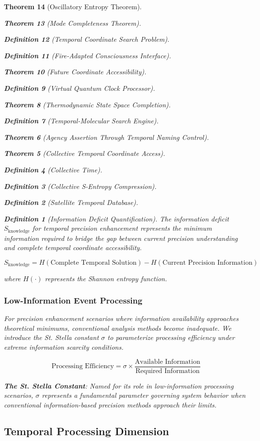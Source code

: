 \documentclass[12pt,a4paper]{article}
\newtheorem{theorem}{Theorem}[section]
\newtheorem{definition}[theorem]{Definition}
\begin{document}
\begin{theorem}[Oscillatory Entropy Theorem]
\begin{theorem}[Mode Completeness Theorem]
\begin{enumerate}
\begin{definition}[Temporal Coordinate Search Problem]
\begin{algorithm}
\begin{definition}[Fire-Adapted Consciousness Interface]
\begin{theorem}[Future Coordinate Accessibility]
\begin{definition}[Virtual Quantum Clock Processor]
\begin{itemize}
\begin{itemize}
\begin{theorem}[Thermodynamic State Space Completion]
\begin{definition}[Temporal-Molecular Search Engine]
\begin{theorem}[Agency Assertion Through Temporal Naming Control]
\begin{remark}
\begin{theorem}[Collective Temporal Coordinate Access]
\begin{definition}[Collective Time]
\begin{definition}[Collective S-Entropy Compression]
\begin{definition}[Satellite Temporal Database]
\begin{algorithm}
\begin{table}[h]
{{\begin{definition}[Information Deficit Quantification]
The information deficit $S_{\text{knowledge}}$ for temporal precision enhancement represents the minimum information required to bridge the gap between current precision understanding and complete temporal coordinate accessibility.
\end{definition}

\begin{equation}
S_{\text{knowledge}} = H(\text{Complete Temporal Solution}) - H(\text{Current Precision Information})
\label{eq:information_deficit}
\end{equation}

where $H(\cdot)$ represents the Shannon entropy function.

\subsubsection{Low-Information Event Processing}

For precision enhancement scenarios where information availability approaches theoretical minimums, conventional analysis methods become inadequate. We introduce the St. Stella constant $\sigma$ to parameterize processing efficiency under extreme information scarcity conditions.

\begin{equation}
\text{Processing Efficiency} = \sigma \times \frac{\text{Available Information}}{\text{Required Information}}
\label{eq:stella_constant}
\end{equation}

\textbf{The St. Stella Constant}: Named for its role in low-information processing scenarios, $\sigma$ represents a fundamental parameter governing system behavior when conventional information-based precision methods approach their limits.

\subsection{Temporal Processing Dimension}

}}
\end{table}
\end{algorithm}
\end{definition}
\end{definition}
\end{definition}
\end{theorem}
\end{remark}
\end{theorem}
\end{definition}
\end{theorem}
\end{itemize}
\end{itemize}
\end{definition}
\end{theorem}
\end{definition}
\end{algorithm}
\end{definition}
\end{enumerate}
\end{theorem}
\end{theorem}
\end{document}
